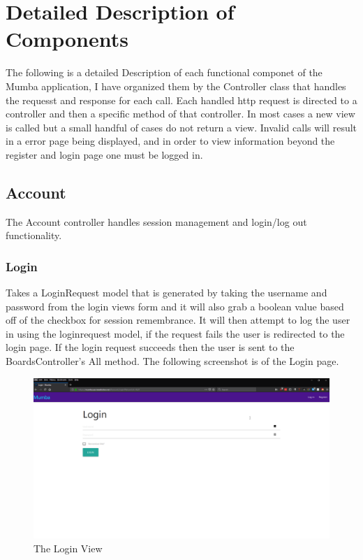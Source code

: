 \documentclass[letterpaper]{article}
\begin{document}
\section{Detailed Description of Components}

The following is a detailed Description of each functional componet of the Mumba application, I have organized them by the Controller class that handles the requesst and response for each call. Each handled http request is directed to a controller and then a specific method of that controller. In most cases a new view is called but a small handful of cases do not return a view.
Invalid calls will result in a error page being displayed, and in order to view information beyond the register and login page one must be logged in.

\subsection{Account}
The Account controller handles session management and login/log out functionality.

\subsubsection{Login}
Takes a LoginRequest model that is generated by taking the username and password from the login views form and it will also grab a boolean value based off of the checkbox for session remembrance. It will then attempt to log the user in using the loginrequest model, if the request fails the user is redirected to the login page. If the login request succeeds then the user is sent to the BoardsController's All method. The following screenshot is of the Login page.


\begin{figure}[H]
  \centering
  \caption{The Login View}
  \includegraphics[scale=0.2]{Images/Login}
\end{figure}
\end{document}
